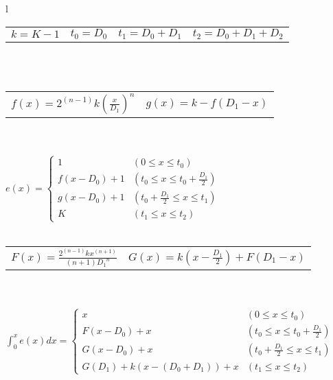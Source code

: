 \documentclass[
  border=2,
  convert={
    density=100 -alpha remove,
    outext=.png
  },
]{standalone}
\begin{document}
\begin{tabular}{l}
  \begin{tabular}{l l l l}
    $\displaystyle k = K - 1$ &
    $\displaystyle t_0 = D_0$ &
    $\displaystyle t_1 = D_0 + D_1$ &
    $\displaystyle t_2 = D_0 + D_1 + D_2$
  \end{tabular}
  \\ \\
  \begin{tabular}{l l}
    $\displaystyle f(x) = 2^{(n-1)} k \left(\frac{x}{D_1}\right)^{n}$ &
    $\displaystyle g(x) = k - f(D_1 - x)$
  \end{tabular}
  \\ \\
  $
    \displaystyle e(x) = \begin{cases}
      1
        & (0  \leq x \leq t_0) \\
      f(x - D_0) + 1
        & \left(t_0 \leq x \leq t_0 + \frac{D_1}{2}\right) \\
      g(x - D_0) + 1
        & \left(t_0 + \frac{D_1}{2} \leq x \leq t_1\right) \\
      K
        & (t_1 \leq x \leq t_2)
    \end{cases}
  $
  \\ \\
  \begin{tabular}{l l}
    $\displaystyle F(x) = \frac{2^{(n-1)}kx^{(n+1)}}{(n+1){D_1}^{n}}$ &
    $\displaystyle G(x) = k\left(x - \frac{D_1}{2}\right) + F(D_1-x)$
  \end{tabular}
  \\ \\
  $
    \displaystyle \int_0^x e(x) dx = \begin{cases}
      x              
        & (0  \leq x \leq t_0) \\
      F(x - D_0) + x
        & \left(t_0 \leq x \leq t_0 + \frac{D_1}{2}\right) \\
      G(x - D_0) + x
        & \left(t_0 + \frac{D_1}{2} \leq x \leq t_1\right) \\
      G(D_1) + k(x - (D_0 + D_1)) + x
        & (t_1 \leq x \leq t_2)
    \end{cases}
  $ 
\end{tabular}
\end{document}
